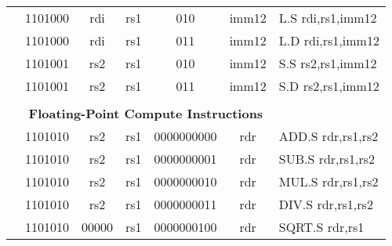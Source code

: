 \begin{table}[p]
\begin{small}
\begin{center}
\begin{tabular}{rcccccccccccl}
&
\multicolumn{2}{|c|}{1101000} &
\multicolumn{1}{c|}{rdi} &
\multicolumn{1}{c|}{rs1} &
\multicolumn{2}{c|}{010} &
\multicolumn{5}{c|}{imm12} & L.S rdi,rs1,imm12 \\
\cline{2-12}
  

&
\multicolumn{2}{|c|}{1101000} &
\multicolumn{1}{c|}{rdi} &
\multicolumn{1}{c|}{rs1} &
\multicolumn{2}{c|}{011} &
\multicolumn{5}{c|}{imm12} & L.D rdi,rs1,imm12 \\
\cline{2-12}
  

&
\multicolumn{2}{|c|}{1101001} &
\multicolumn{1}{c|}{rs2} &
\multicolumn{1}{c|}{rs1} &
\multicolumn{2}{c|}{010} &
\multicolumn{5}{c|}{imm12} & S.S rs2,rs1,imm12 \\
\cline{2-12}
  

&
\multicolumn{2}{|c|}{1101001} &
\multicolumn{1}{c|}{rs2} &
\multicolumn{1}{c|}{rs1} &
\multicolumn{2}{c|}{011} &
\multicolumn{5}{c|}{imm12} & S.D rs2,rs1,imm12 \\
\cline{2-12}
  

&
\multicolumn{11}{c}{} & \\
&
\multicolumn{11}{c}{\bf Floating-Point Compute Instructions} & \\
\cline{2-12}
  

&
\multicolumn{2}{|c|}{1101010} &
\multicolumn{1}{c|}{rs2} &
\multicolumn{1}{c|}{rs1} &
\multicolumn{6}{c|}{0000000000} &
\multicolumn{1}{c|}{rdr} & ADD.S rdr,rs1,rs2 \\
\cline{2-12}
  

&
\multicolumn{2}{|c|}{1101010} &
\multicolumn{1}{c|}{rs2} &
\multicolumn{1}{c|}{rs1} &
\multicolumn{6}{c|}{0000000001} &
\multicolumn{1}{c|}{rdr} & SUB.S rdr,rs1,rs2 \\
\cline{2-12}
  

&
\multicolumn{2}{|c|}{1101010} &
\multicolumn{1}{c|}{rs2} &
\multicolumn{1}{c|}{rs1} &
\multicolumn{6}{c|}{0000000010} &
\multicolumn{1}{c|}{rdr} & MUL.S rdr,rs1,rs2 \\
\cline{2-12}
  

&
\multicolumn{2}{|c|}{1101010} &
\multicolumn{1}{c|}{rs2} &
\multicolumn{1}{c|}{rs1} &
\multicolumn{6}{c|}{0000000011} &
\multicolumn{1}{c|}{rdr} & DIV.S rdr,rs1,rs2 \\
\cline{2-12}
  

&
\multicolumn{2}{|c|}{1101010} &
\multicolumn{1}{c|}{00000} &
\multicolumn{1}{c|}{rs1} &
\multicolumn{6}{c|}{0000000100} &
\multicolumn{1}{c|}{rdr} & SQRT.S rdr,rs1 \\
\cline{2-12}
  


\end{tabular}
\end{center}
\end{small}
\end{table}
